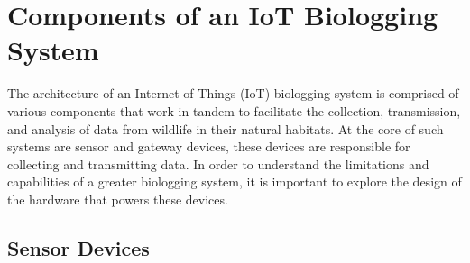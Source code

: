 \documentclass[sigplan,screen,nonacm]{acmart}
\begin{document}
\section{Components of an IoT Biologging System}
\label{sec:Components of a IoT Biologging Device}

The architecture of an Internet of Things (IoT) biologging system is comprised of various 
components that work in tandem to facilitate the collection, transmission, and analysis of data from 
wildlife in their natural habitats. At the core of such systems are sensor and gateway devices, these devices are responsible 
for collecting and transmitting data. In order to understand the limitations and capabilities of a greater biologging system, 
it is important to explore the design of the hardware that powers these devices.

\subsection{Sensor Devices}
\label{subsec:Sensor Devices}
\end{document}
